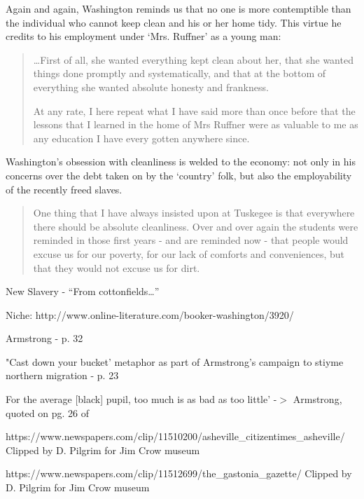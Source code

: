 Again and again, Washington reminds us that no one is more contemptible than the individual who cannot keep clean and his or her home tidy. This virtue he credits to his employment under `Mrs. Ruffner' as a young man:

\begin{quote}

{\ldots}First of all, she wanted everything kept clean about her, that she wanted things done promptly and systematically, and that at the bottom of everything she wanted absolute honesty and frankness.

At any rate, I here repeat what I have said more than once before that the lessons that I learned in the home of Mrs Ruffner were as valuable to me as any education I have every gotten anywhere since. ~\citep[p. 26]{Washington:1952uf}
\end{quote}

Washington's obsession with cleanliness is welded to the economy: not only in his concerns over the debt taken on by the `country' folk, but also the employability of the recently freed slaves. 

\begin{quote}

One thing that I have always insisted upon at Tuskegee is that everywhere there should be absolute cleanliness. Over and over again the students were reminded in those first years - and are reminded now - that people would excuse us for our poverty, for our lack of comforts and conveniences, but that they would not excuse us for dirt. ~\citep[p. 102]{Washington:1952uf}
\end{quote}

New Slavery - ``From cottonfields{\ldots}''

Niche: http:\slash \slash www.online-literature.com\slash booker-washington\slash 3920\slash 

Armstrong - p. 32

"Cast down your bucket' metaphor as part of Armstrong's campaign to stiyme northern migration - p. 23 ~\citep{Spivey:1978un} 

For the average [black] pupil, too much is as bad as too little' -$>$ Armstrong, quoted on pg. 26 of ~\citep{Spivey:1978un} 

https:\slash \slash www.newspapers.com\slash clip\slash 11510200\slash asheville\_citizentimes\_asheville\slash 
Clipped by D. Pilgrim for Jim Crow museum

https:\slash \slash www.newspapers.com\slash clip\slash 11512699\slash the\_gastonia\_gazette\slash 
Clipped by D. Pilgrim for Jim Crow museum

